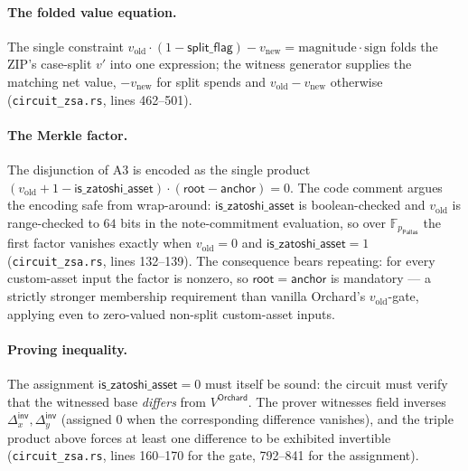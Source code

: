 \documentclass[11pt,a4paper]{article}
\theoremstyle{definition}
\newcommand{\F}{\mathbb{F}}
\newcommand{\Pallas}{\ensuremath{\mathsf{Pallas}}}
\begin{document}
\paragraph{The folded value equation.} The single constraint
$v_{\mathrm{old}} \cdot (1 - \mathsf{split\_flag}) - v_{\mathrm{new}} =
\mathrm{magnitude} \cdot \mathrm{sign}$ folds the ZIP's case-split $v'$
into one expression; the witness generator supplies the matching net
value, $-v_{\mathrm{new}}$ for split spends and $v_{\mathrm{old}} -
v_{\mathrm{new}}$ otherwise (\texttt{circuit\_zsa.rs}, lines 462--501).

\paragraph{The Merkle factor.} The disjunction of A3 is encoded as the
single product $(v_{\mathrm{old}} + 1 - \mathsf{is\_zatoshi\_asset})
\cdot (\mathsf{root} - \mathsf{anchor}) = 0$. The code comment argues the
encoding safe from wrap-around: $\mathsf{is\_zatoshi\_asset}$ is
boolean-checked and $v_{\mathrm{old}}$ is range-checked to $64$ bits in
the note-commitment evaluation, so over $\F_{p_{\Pallas}}$ the first
factor vanishes exactly when $v_{\mathrm{old}} = 0$ and
$\mathsf{is\_zatoshi\_asset} = 1$ (\texttt{circuit\_zsa.rs}, lines
132--139). The consequence bears repeating: for every custom-asset input
the factor is nonzero, so $\mathsf{root} = \mathsf{anchor}$ is mandatory
--- a strictly stronger membership requirement than vanilla Orchard's
$v_{\mathrm{old}}$-gate, applying even to zero-valued non-split
custom-asset inputs.

\paragraph{Proving inequality.} The assignment
$\mathsf{is\_zatoshi\_asset} = 0$ must itself be sound: the circuit must
verify that the witnessed base \emph{differs} from $V^{\mathsf{Orchard}}$.
The prover witnesses field inverses $\Delta_x^{\mathsf{inv}},
\Delta_y^{\mathsf{inv}}$ (assigned $0$ when the corresponding difference
vanishes), and the triple product above forces at least one difference to
be exhibited invertible (\texttt{circuit\_zsa.rs}, lines 160--170 for the
gate, 792--841 for the assignment).
\end{document}
